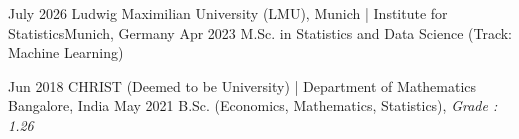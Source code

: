 \begin{educations}
\education
    {July 2026}   {Ludwig Maximilian University (LMU), Munich | Institute for Statistics}{Munich, Germany}{}
    {Apr 2023} {M.Sc. in Statistics and Data Science (Track: Machine Learning)
    }
    
 \emptySeparator
  \education
    {Jun 2018}   {CHRIST (Deemed to be University) | Department of Mathematics }{Bangalore, India}{}
    {May 2021} {B.Sc. (Economics, Mathematics, Statistics), \textit{Grade : 1.26}
    }
\end{educations}
\vspace{-3mm}
